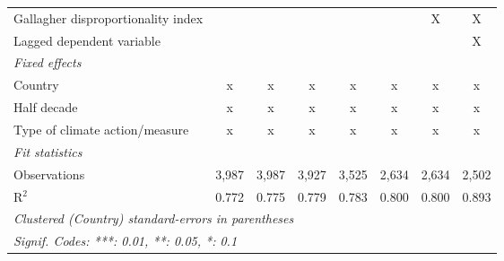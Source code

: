 \begin{tabular}{lccccccc}
   Gallagher disproportionality index                                &         &         &              &               &                & X              & X\\  
   Lagged dependent variable                                         &         &         &              &               &                &                & X\\  
   \emph{Fixed effects}\\
   Country                                                           & x       & x       & x            & x             & x              & x              & x\\  
   Half decade                                                       & x       & x       & x            & x             & x              & x              & x\\  
   Type of climate action/measure                                    & x       & x       & x            & x             & x              & x              & x\\  
   \midrule \emph{Fit statistics}\\
   Observations                                                      & 3,987   & 3,987   & 3,927        & 3,525         & 2,634          & 2,634          & 2,502\\  
   R$^2$                                                             & 0.772   & 0.775   & 0.779        & 0.783         & 0.800          & 0.800          & 0.893\\  
   \midrule
   \multicolumn{8}{l}{\emph{Clustered (Country) standard-errors in parentheses}}\\
   \multicolumn{8}{l}{\emph{Signif. Codes: ***: 0.01, **: 0.05, *: 0.1}}\\
\end{tabular}
\par\endgroup


